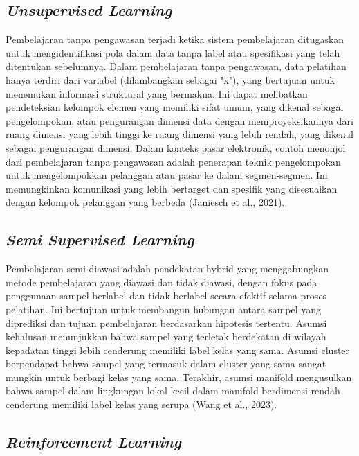 \subsection{\emph{Unsupervised Learning}}
\label{subsec:unsupervisedlearning}

Pembelajaran tanpa pengawasan terjadi ketika sistem pembelajaran ditugaskan untuk mengidentifikasi pola dalam data tanpa label atau spesifikasi yang telah ditentukan sebelumnya. Dalam pembelajaran tanpa pengawasan, data pelatihan hanya terdiri dari variabel (dilambangkan sebagai "x"), yang bertujuan untuk menemukan informasi struktural yang bermakna. Ini dapat melibatkan pendeteksian kelompok elemen yang memiliki sifat umum, yang dikenal sebagai pengelompokan, atau pengurangan dimensi data dengan memproyeksikannya dari ruang dimensi yang lebih tinggi ke ruang dimensi yang lebih rendah, yang dikenal sebagai pengurangan dimensi. Dalam konteks pasar elektronik, contoh menonjol dari pembelajaran tanpa pengawasan adalah penerapan teknik pengelompokan untuk mengelompokkan pelanggan atau pasar ke dalam segmen-segmen. Ini memungkinkan komunikasi yang lebih bertarget dan spesifik yang disesuaikan dengan kelompok pelanggan yang berbeda (Janiesch et al., 2021).

\subsection{\emph{Semi Supervised Learning}}
\label{subsec:semiisupervisedlearning}

Pembelajaran semi-diawasi adalah pendekatan hybrid yang menggabungkan metode pembelajaran yang diawasi dan tidak diawasi, dengan fokus pada penggunaan sampel berlabel dan tidak berlabel secara efektif selama proses pelatihan. Ini bertujuan untuk membangun hubungan antara sampel yang diprediksi dan tujuan pembelajaran berdasarkan hipotesis tertentu. Asumsi kehalusan menunjukkan bahwa sampel yang terletak berdekatan di wilayah kepadatan tinggi lebih cenderung memiliki label kelas yang sama. Asumsi cluster berpendapat bahwa sampel yang termasuk dalam cluster yang sama sangat mungkin untuk berbagi kelas yang sama. Terakhir, asumsi manifold mengusulkan bahwa sampel dalam lingkungan lokal kecil dalam manifold berdimensi rendah cenderung memiliki label kelas yang serupa (Wang et al., 2023).

\subsection{\emph{Reinforcement Learning}}
\label{subsec:reinforcementlearning}

